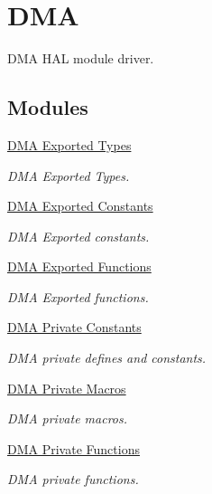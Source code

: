 \hypertarget{group___d_m_a}{}\section{D\+MA}
\label{group___d_m_a}


D\+MA H\+AL module driver.  


\subsection*{Modules}
\begin{DoxyCompactItemize}
\item 
\hyperlink{group___d_m_a___exported___types}{D\+M\+A Exported Types}
\begin{DoxyCompactList}\small\item\em D\+MA Exported Types. \end{DoxyCompactList}\item 
\hyperlink{group___d_m_a___exported___constants}{D\+M\+A Exported Constants}
\begin{DoxyCompactList}\small\item\em D\+MA Exported constants. \end{DoxyCompactList}\item 
\hyperlink{group___d_m_a___exported___functions}{D\+M\+A Exported Functions}
\begin{DoxyCompactList}\small\item\em D\+MA Exported functions. \end{DoxyCompactList}\item 
\hyperlink{group___d_m_a___private___constants}{D\+M\+A Private Constants}
\begin{DoxyCompactList}\small\item\em D\+MA private defines and constants. \end{DoxyCompactList}\item 
\hyperlink{group___d_m_a___private___macros}{D\+M\+A Private Macros}
\begin{DoxyCompactList}\small\item\em D\+MA private macros. \end{DoxyCompactList}\item 
\hyperlink{group___d_m_a___private___functions}{D\+M\+A Private Functions}
\begin{DoxyCompactList}\small\item\em D\+MA private functions. \end{DoxyCompactList}\end{DoxyCompactItemize}
